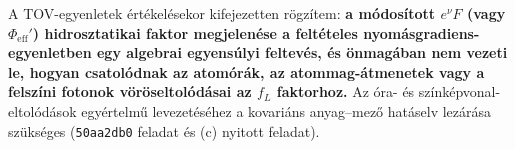 \par
A TOV-egyenletek \'ert\'ekel\'esekor kifejezetten r\"ogz\'item: \textbf{a m\'odos\'itott $e^\nu F$ (vagy $\Phi_{\text{eff}}'$) hidrosztatikai faktor megjelen\'ese a felt\'eteles nyom\'asgradiens-egyenletben egy algebrai egyens\'ulyi feltev\'es, \'es \"onmag\'aban nem vezeti le, hogyan csatol\'odnak az atom\'or\'ak, az atommag-\'atmenetek vagy a felsz\'ini fotonok v\"or\"oseltol\'od\'asai az $f_L$ faktorhoz.} Az \'ora- \'es színk\'epvonal-eltol\'od\'asok egy\'ertelm\H{u} levezet\'es\'ehez a kovari\'ans anyag--mez\H{o} hat\'aselv lez\'ar\'asa sz\"uks\'eges (\texttt{50aa2db0} feladat \'es (c) nyitott feladat).
\newpage
